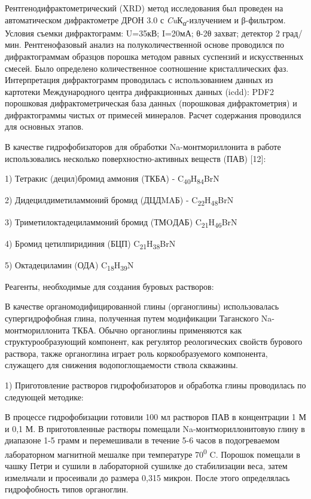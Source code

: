 \begin{multicols}{2}
Рентгенодифрактометрический (XRD) метод исследования был проведен на
автоматическом дифрактометре ДРОН 3.0 с
\emph{Cu}К\emph{\textsubscript{α}}-излучением и β-фильтром. Условия
съемки дифрактограмм: U=35кВ; I=20мА; θ-2θ захват; детектор 2 град/мин.
Рентгенофазовый анализ на полуколичественной основе проводился по
дифрактограммам образцов порошка методом равных суспензий и
искусственных смесей. Было определено количественное соотношение
кристаллических фаз. Интерпретация дифрактограмм проводилась с
использованием данных из картотеки Международного центра дифракционных
данных (icdd): PDF2 порошковая дифрактометрическая база данных
(порошковая дифрактометрия) и дифрактограммы чистых от примесей
минералов. Расчет содержания проводился для основных этапов.

В качестве гидрофобизаторов для обработки Na-монтмориллонита в работе
использовались несколько поверхностно-активных веществ (ПАВ) {[}12{]}:

1) Тетракис (децил)бромид аммония (ТКБА) - C\textsubscript{40}H\textsubscript{84}BrN

2) Дидецилдиметиламмоний бромид (ДЦДMAБ) - C\textsubscript{22}H\textsubscript{48}BrN

3) Триметилоктадециламмоний бромид (ТМOДАБ)
  C\textsubscript{21}H\textsubscript{46}BrN

4) Бромид цетилпиридиния (БЦП) C\textsubscript{21}H\textsubscript{38}BrN

5) Октадециламин (ОДА) C\textsubscript{18}H\textsubscript{39}N

Реагенты, необходимые для создания буровых растворов:

В качестве органомодифицированной глины (органоглины) использовалась
супергидрофобная глина, полученная путем модификации Таганского
Na-монтмориллонита ТКБА. Обычно органоглины применяются как
структурообразующий компонент, как регулятор реологических свойств
бурового раствора, также органоглина играет роль коркообразуемого
компонента, служащего для снижения водопоглощаемости ствола скважины.

1) Приготовление растворов гидрофобизаторов и обработка глины
проводилась по следующей методике:

В процессе гидрофобизации готовили 100 мл растворов ПАВ в концентрации 1
М и 0,1 М. В приготовленные растворы помещали Na-монтмориллонитовую
глину в диапазоне 1-5 грамм и перемешивали в течение 5-6 часов в
подогреваемом лабораторном магнитной мешалке при температуре
70\textsuperscript{0} C. Порошок помещали в чашку Петри и сушили в
лабораторной сушилке до стабилизации веса, затем измельчали и просеивали
до размера 0,315 микрон. После этого определялась гидрофобность типов
органоглин.


\end{multicols}
